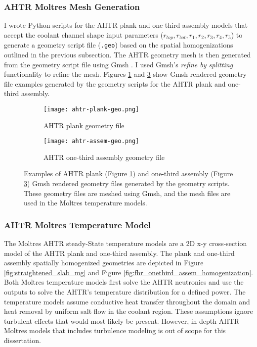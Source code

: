 \subsubsection{AHTR Moltres Mesh Generation}
I wrote Python scripts for the \gls{AHTR} plank and one-third assembly models 
that accept the coolant channel shape input parameters 
($r_{top}, r_{bot}, r_1, r_2, r_3, r_4, r_5$) to generate a geometry script file 
(\texttt{.geo}) based on the spatial homogenizations outlined in the previous 
subsection.
The \gls{AHTR} geometry mesh is then generated from the geometry script file using 
Gmsh \cite{geuzaine_gmsh_2009}.
I used Gmsh's \textit{refine by splitting} functionality to refine the mesh. 
Figures \ref{fig:ahtr-plank-geo} and \ref{fig:ahtr-assem-geo} show Gmsh rendered 
geometry file examples generated by the geometry scripts for the \gls{AHTR} plank 
and one-third assembly.
\begin{figure}[htbp]
    \centering
    \begin{subfigure}{\textwidth}
        \texttt{[image: ahtr-plank-geo.png]}
        \caption{\acrfull{AHTR} plank geometry file}
        \label{fig:ahtr-plank-geo} 
    \end{subfigure}
    \begin{subfigure}{\textwidth}
        \texttt{[image: ahtr-assem-geo.png]}
        \caption{\acrfull{AHTR} one-third assembly geometry file}
        \label{fig:ahtr-assem-geo} 
    \end{subfigure}
    \caption{Examples of \gls{AHTR} plank (Figure \ref{fig:ahtr-plank-geo}) and 
    one-third assembly (Figure \ref{fig:ahtr-assem-geo}) Gmsh rendered geometry files 
    generated by the geometry scripts.
    These geometry files are meshed using Gmsh, and the mesh files are used in the 
    Moltres temperature models.}
\end{figure}

\subsubsection{AHTR Moltres Temperature Model}
\label{sec:ahtr-moltres-temperature-model}
The Moltres \gls{AHTR} steady-State temperature models are a 2D x-y cross-section 
model of the \gls{AHTR} plank and one-third assembly.
The plank and one-third assembly spatially homogenized geometries are depicted in
Figure \ref{fig:straightened_slab_mg} and Figure 
\ref{fig:fhr_onethird_assem_homogenization}.  
Both Moltres temperature models first solve the \gls{AHTR} neutronics and use the 
outputs to solve the \gls{AHTR}'s temperature distribution for a defined power.
The temperature models assume conductive heat transfer throughout the domain 
and heat removal by uniform salt flow in the coolant region. 
These assumptions ignore turbulent effects that would most likely be present. 
However, in-depth \gls{AHTR} Moltres models that includes turbulence modeling is 
out of scope for this dissertation. 

